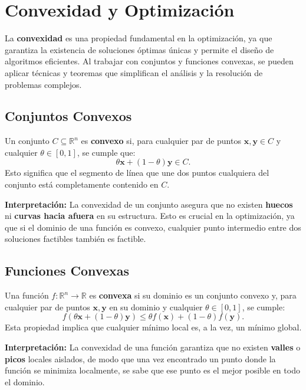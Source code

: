 \documentclass[12pt,a4,oneside]{book}
\begin{document}
	\section{Convexidad y Optimización}
	
	La \textbf{convexidad} es una propiedad fundamental en la optimización, ya que garantiza la existencia de soluciones óptimas únicas y permite el diseño de algoritmos eficientes. Al trabajar con conjuntos y funciones convexas, se pueden aplicar técnicas y teoremas que simplifican el análisis y la resolución de problemas complejos.
	
	\subsection{Conjuntos Convexos}
	
	Un conjunto \( C \subseteq \mathbb{R}^n \) es \textbf{convexo} si, para cualquier par de puntos \(\mathbf{x}, \mathbf{y} \in C\) y cualquier \(\theta \in [0,1]\), se cumple que:
	\[
	\theta \mathbf{x} + (1 - \theta) \mathbf{y} \in C.
	\]
	Esto significa que el segmento de línea que une dos puntos cualquiera del conjunto está completamente contenido en \( C \).
	
	\textbf{Interpretación:}  
	La convexidad de un conjunto asegura que no existen \textbf{huecos} ni \textbf{curvas hacia afuera} en su estructura. Esto es crucial en la optimización, ya que si el dominio de una función es convexo, cualquier punto intermedio entre dos soluciones factibles también es factible.
	
	\subsection{Funciones Convexas}
	
	Una función \( f: \mathbb{R}^n \to \mathbb{R} \) es \textbf{convexa} si su dominio es un conjunto convexo y, para cualquier par de puntos \(\mathbf{x}, \mathbf{y}\) en su dominio y cualquier \(\theta \in [0,1]\), se cumple:
	\[
	f(\theta \mathbf{x} + (1 - \theta) \mathbf{y}) \leq \theta f(\mathbf{x}) + (1 - \theta) f(\mathbf{y}).
	\]
	Esta propiedad implica que cualquier mínimo local es, a la vez, un mínimo global.
	
	\textbf{Interpretación:}  
	La convexidad de una función garantiza que no existen \textbf{valles} o \textbf{picos} locales aislados, de modo que una vez encontrado un punto donde la función se minimiza localmente, se sabe que ese punto es el mejor posible en todo el dominio.
	
\end{document}
